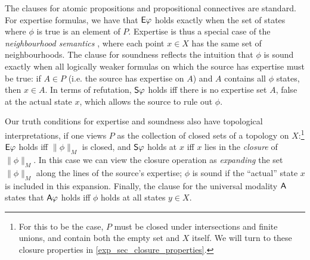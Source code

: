 The clauses for atomic propositions and propositional
connectives are standard. For expertise formulas, we have that $\E\phi$
holds exactly when the set of states where $\phi$ is true is an element
of $P$. Expertise is thus a special case of the \emph{neighbourhood semantics}
\cite{Scott1970,montague1970universal,pacuit2017neighborhood}, where each point $x \in X$ has the same
set of neighbourhoods. The clause for soundness reflects the intuition that
$\phi$ is sound exactly when all logically weaker formulas on which the
source has expertise must be true: if $A \in P$ (i.e. the source has
expertise on $A$) and $A$ contains all $\phi$ states, then
$x \in A$. In terms of refutation, $\S\phi$ holds iff there is no
expertise set $A$, false at the actual state $x$, which allows the
source to rule out $\phi$.

Our truth conditions for expertise and soundness also have topological
interpretations, if one views $P$ as the collection of closed sets of a
topology on $X$:\footnote{For this to be the case, $P$ must be closed under
intersections and finite unions, and contain both the empty set and $X$ itself.
We will turn to these closure properties in \cref{exp_sec_closure_properties}.} $\E\phi$ holds
iff $\|\phi\|_M$ is closed, and $\S\phi$ holds at $x$ iff $x$ lies in the
\emph{closure} of $\|\phi\|_M$.\footnotemark{} In this case we can view the
closure operation as \emph{expanding} the set $\|\phi\|_M$ along the lines of
the source's expertise; $\phi$ is sound if the ``actual'' state $x$ is included
in this expansion.
%
Finally, the clause for the universal modality $\A$ states that $\A\phi$ holds
iff $\phi$ holds at all states $y \in X$.


\def\w{1}
\def\h{0.4}
\newcommand{\examplemodel}{
    \tikzset{mynode/.style={color=black}}
    \node[mynode] (a) at (0, 0) {$ipd$};
    \node[mynode] (b) at (\w, 0) {$pd$};
    \node[mynode] (c) at (0, \h) {$ip$};
    \node[mynode] (d) at (\w, \h) {$p$};
    \node[mynode] (e) at (0, 2*\h) {$id$};
    \node[mynode] (f) at (\w, 2*\h) {$d$};
    \node[mynode] (g) at (0, 3*\h) {$i$};
    \node[mynode] (h) at (\w, 3*\h) {$\emptyset$};
}

